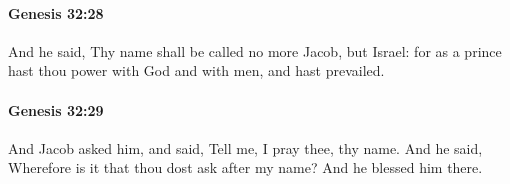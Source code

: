 		\paragraph{Genesis 32:28} %
			\label{GENESIS-32-28}

			And he said, Thy name shall be called no more Jacob, but Israel: for as a prince hast thou power with God and with men, and hast prevailed.


		\paragraph{Genesis 32:29} %
			\label{GENESIS-32-29}

			And Jacob asked him, and said, Tell me, I pray thee, thy name. And he said, Wherefore is it that thou dost ask after my name? And he blessed him there.


